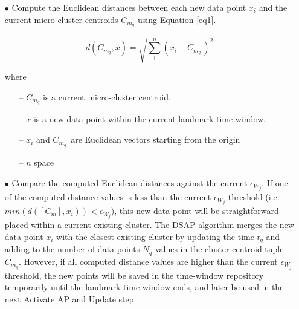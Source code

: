 \begin{itemize}
    \item[$\bullet$] Compute the Euclidean distances between each new data point $x_i$ and the current micro-cluster centroids $C_{m_q}$ using Equation \ref{eq1}.
    
    \begin{equation}
    d\left( C_{m_q},x \right)   = \sqrt { \sum_{1}^{n} \left( x_{i} - C_{m_{q_i}}\right)^2} \label{eq1}
    \end{equation}

    where
    \begin{itemize}
        \item[--] $C_{m_q}$ is a current micro-cluster centroid,
        \item[--] $x$ is a new data point within the current landmark time window.
        \item[--] $x_{i}$ and $C_{m_{q_i}}$ are Euclidean vectors starting from the origin
        \item[--] $n$ space
    \end{itemize}
     
    


    \item[$\bullet$] Compare the computed Euclidean distances against the current $\epsilon_{W_j}$. If one of the computed distance values is less than the current $\epsilon_{W_j}$ threshold (i.e. $min(d([C_{m}],x_i)) < \epsilon_{W_j}$), this new data point will be straightforward placed within a current existing cluster. The DSAP algorithm merges the new data point $x_i$ with the closest existing cluster by updating  the time $t_q$ and adding to the number of data points $N_q$ values in the cluster centroid tuple $C_{m_q}$. However, if all computed distance values are higher than the current $\epsilon_{W_j}$ threshold, the new points will be saved in the time-window repository temporarily until the landmark time window ends, and later be used in the next Activate AP and Update step.    
\end{itemize}

